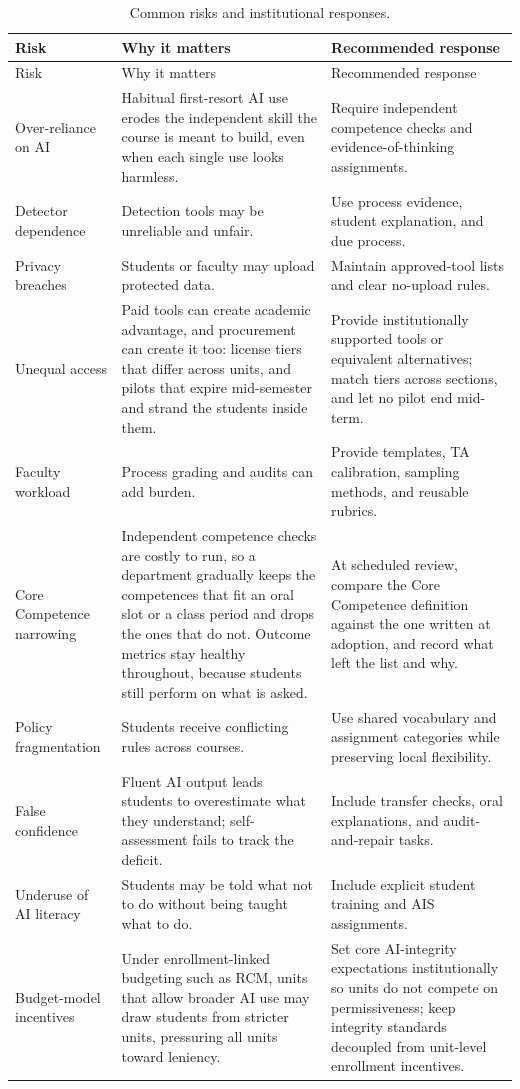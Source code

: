 \documentclass{SIAMbook2023}
\begin{document}
\begin{longtable}{>{\raggedright\arraybackslash}p{}>{\raggedright\arraybackslash}p{}>{\raggedright\arraybackslash}p{}}
  \caption{Common risks and institutional responses.}\label{u:tab:risk-register}\\
  \toprule
  Risk & Why it matters & Recommended response \\
  \midrule
  \endfirsthead
  \toprule
  Risk & Why it matters & Recommended response \\
  \midrule
  \endhead
  Over-reliance on AI & Habitual first-resort AI use erodes the independent skill the course is meant to build, even when each single use looks harmless. & Require independent competence checks and evidence-of-thinking assignments. \\
  Detector dependence & Detection tools may be unreliable and unfair. & Use process evidence, student explanation, and due process. \\
  Privacy breaches & Students or faculty may upload protected data. & Maintain approved-tool lists and clear no-upload rules. \\
  Unequal access & Paid tools can create academic advantage, and procurement can create it too: license tiers that differ across units, and pilots that expire mid-semester and strand the students inside them. & Provide institutionally supported tools or equivalent alternatives; match tiers across sections, and let no pilot end mid-term. \\
  Faculty workload & Process grading and audits can add burden. & Provide templates, TA calibration, sampling methods, and reusable rubrics. \\
  Core Competence narrowing & Independent competence checks are costly to run, so a department gradually keeps the competences that fit an oral slot or a class period and drops the ones that do not. Outcome metrics stay healthy throughout, because students still perform on what is asked. & At scheduled review, compare the Core Competence definition against the one written at adoption, and record what left the list and why. \\
Policy fragmentation & Students receive conflicting rules across courses. & Use shared vocabulary and assignment categories while preserving local flexibility. \\
  False confidence & Fluent AI output leads students to overestimate what they understand; self-assessment fails to track the deficit. & Include transfer checks, oral explanations, and audit-and-repair tasks. \\
  Underuse of AI literacy & Students may be told what not to do without being taught what to do. & Include explicit student training and AIS assignments. \\
  Budget-model incentives & Under enrollment-linked budgeting such as RCM, units that allow broader AI use may draw students from stricter units, pressuring all units toward leniency. & Set core AI-integrity expectations institutionally so units do not compete on permissiveness; keep integrity standards decoupled from unit-level enrollment incentives. \\
  \bottomrule
\end{longtable}
\end{document}

